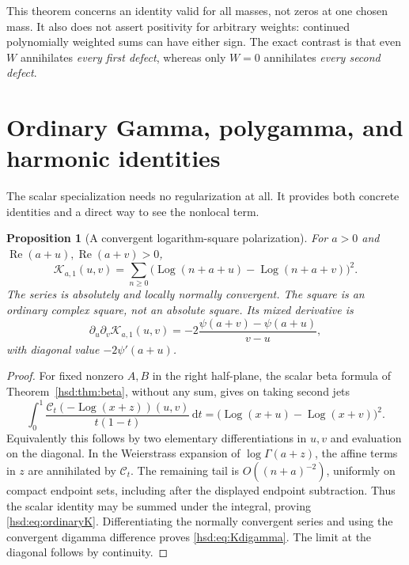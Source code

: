 \documentclass[11pt]{article}
\numberwithin{equation}{section}
\newtheorem{proposition}[theorem]{Proposition}
\theoremstyle{definition}\newtheorem{definition}[theorem]{Definition}
\theoremstyle{remark}\newtheorem{remark}[theorem]{Remark}
\DeclareMathOperator{\Rea}{Re}
\DeclareMathOperator{\Log}{Log}
\newcommand{\dd}{\,\mathrm d}
\newcommand{\CC}{\mathcal C}
\newcommand{\KK}{\mathcal K}
\begin{document}
This theorem concerns an identity valid for all masses, not zeros at one
chosen mass. It also does not assert positivity for arbitrary weights:
continued polynomially weighted sums can have either sign. The exact
contrast is that even $W$ annihilates \emph{every first defect}, whereas
only $W=0$ annihilates \emph{every second defect}.

\section{Ordinary Gamma, polygamma, and harmonic identities}
\label{hsd:sec:ordinary}
The scalar specialization needs no regularization at all. It provides
both concrete identities and a direct way to see the nonlocal term.

\begin{proposition}[A convergent logarithm-square polarization]
\label{hsd:prop:ordinaryK}
For $a>0$ and $\Rea(a+u),\Rea(a+v)>0$,
\begin{equation}\label{hsd:eq:ordinaryK}
 \KK_{a,1}(u,v)=\sum_{n\ge0}
       \bigl(\Log(n+a+u)-\Log(n+a+v)\bigr)^2.
\end{equation}
The series is absolutely and locally normally convergent. The square is
an ordinary complex square, not an absolute square. Its mixed derivative is
\begin{equation}\label{hsd:eq:Kdigamma}
 \partial_u\partial_v\KK_{a,1}(u,v)
 =-2\frac{\psi(a+v)-\psi(a+u)}{v-u},
\end{equation}
with diagonal value $-2\psi'(a+u)$.
\end{proposition}
\begin{proof}
For fixed nonzero $A,B$ in the right half-plane, the scalar beta formula
of Theorem~\ref{hsd:thm:beta}, without any sum, gives on taking second
jets
\[
 \int_0^1\frac{\CC_t(-\Log(x+z))(u,v)}{t(1-t)}\dd t
       =\bigl(\Log(x+u)-\Log(x+v)\bigr)^2.
\]
Equivalently this follows by two elementary differentiations in $u,v$
and evaluation on the diagonal. In the Weierstrass expansion of
$\log\Gamma(a+z)$, the affine terms in $z$ are annihilated by $\CC_t$.
The remaining tail is $O((n+a)^{-2})$, uniformly on compact endpoint
sets, including after the displayed endpoint subtraction. Thus the
scalar identity may be summed under the integral, proving
\eqref{hsd:eq:ordinaryK}. Differentiating the normally convergent series
and using the convergent digamma difference proves
\eqref{hsd:eq:Kdigamma}. The limit at the diagonal follows by continuity.
\end{proof}
\end{document}
